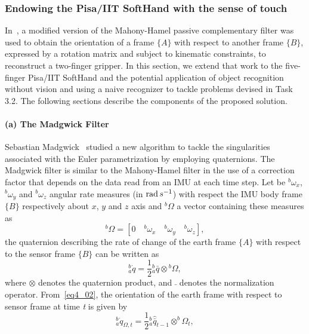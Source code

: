 
\subsubsection{Endowing the Pisa/IIT SoftHand with the sense of touch}
\label{sec:SenseOfTouch}

In~\cite{Santaera:ICRA:2015}, a modified version of the Mahony-Hamel passive complementary filter was used to obtain the orientation of a frame $\{ A \}$ with respect to another frame $\{ B \}$, expressed by a rotation matrix and subject to kinematic constraints, to reconstruct a two-finger gripper. In this section, we extend that work to the five-finger Pisa/IIT SoftHand and the potential application of object recognition without vision and using a naive recognizer to tackle problems devised in Task 3.2. The following sections describe the components of the proposed solution.

\paragraph{(a) The Madgwick Filter}

Sebastian Madgwick~\cite{MadgwickMARG} studied a new algorithm to tackle the singularities associated with the Euler parametrization by employing quaternions. The Madgwick filter is similar to the Mahony-Hamel filter in the use of a correction factor that depends on the data read from an IMU at each time step. Let be ${^b\omega_x}$, ${^b\omega_y}$ and ${^b\omega_z}$ angular rate measures (in $\operatorname{rad} s^{-1}$) with respect the IMU body frame $\{ B\}$ respectively about $x$, $y$ and $z$ axis and $^{b}\Omega$ a vector containing these measures as
\begin{equation}
\label{eq4_01}
^b \Omega = [ 0 \quad {^b\omega_x} \quad {^b\omega_y} \quad {^b\omega_z} ],
\end{equation}
the quaternion describing the rate of change of the earth frame $\{ A \}$ with respect to the sensor frame $\{ B \}$ can be written as
\begin{equation}
\label{eq4_02}
^b_a\dot{q} = \frac{1}{2} {^b_a \bar{q}}  \otimes {^b\Omega},
\end{equation}
where $\otimes$ denotes the quaternion product, and $\bar{}$ denotes the normalization operator. From~\eqref{eq4_02}, the orientation of the earth frame with respect to sensor frame at time \textit{t} is given by
\begin{equation}
\label{eq4_03}
^b_a \dot{q}_{\Omega,t} = \frac{1}{2} {^b_a \hat{\bar{q}}_{t-1}} \otimes ^b \Omega_t,
\end{equation}


